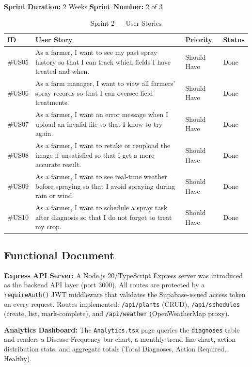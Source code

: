 \documentclass[12pt,a4paper]{report}
\begin{document}
\medskip
\textbf{Sprint Duration:} 2 Weeks \hfill \textbf{Sprint Number:} 2 of 3

\begin{table}[H]
\centering
\caption{Sprint 2 --- User Stories}
\label{tab:sprint2_us}
\renewcommand{\arraystretch}{1.4}
\begin{tabular}{|p{1.4cm}|p{7.8cm}|p{2.4cm}|p{1.8cm}|}
\hline
\textbf{ID} & \textbf{User Story} & \textbf{Priority} & \textbf{Status} \\
\hline
\#US05 & As a farmer, I want to see my past spray history so that I can track which fields I have treated and when. & Should Have & Done \\
\hline
\#US06 & As a farm manager, I want to view all farmers' spray records so that I can oversee field treatments. & Should Have & Done \\
\hline
\#US07 & As a farmer, I want an error message when I upload an invalid file so that I know to try again. & Should Have & Done \\
\hline
\#US08 & As a farmer, I want to retake or reupload the image if unsatisfied so that I get a more accurate result. & Should Have & Done \\
\hline
\#US09 & As a farmer, I want to see real-time weather before spraying so that I avoid spraying during rain or wind. & Should Have & Done \\
\hline
\#US10 & As a farmer, I want to schedule a spray task after diagnosis so that I do not forget to treat my crop. & Should Have & Done \\
\hline
\end{tabular}
\end{table}

\subsection{Functional Document}

\textbf{Express API Server:} A Node.js 20/TypeScript Express server was introduced as the backend API layer (port 3000). All routes are protected by a \texttt{requireAuth()} JWT middleware that validates the Supabase-issued access token on every request. Routes implemented: \texttt{/api/plants} (CRUD), \texttt{/api/schedules} (create, list, mark-complete), and \texttt{/api/weather} (OpenWeatherMap proxy).

\textbf{Analytics Dashboard:} The \texttt{Analytics.tsx} page queries the \texttt{diagnoses} table and renders a Disease Frequency bar chart, a monthly trend line chart, action distribution stats, and aggregate totals (Total Diagnoses, Action Required, Healthy).
\end{document}
